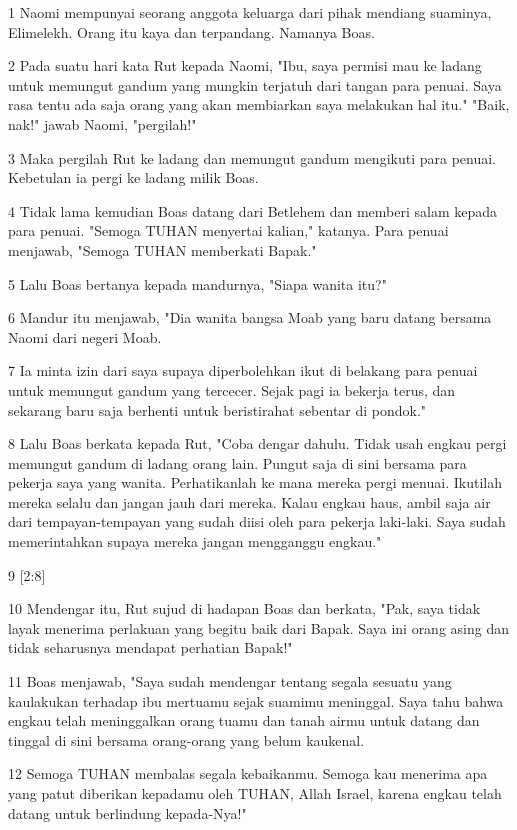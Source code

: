 \par 1 Naomi mempunyai seorang anggota keluarga dari pihak mendiang suaminya, Elimelekh. Orang itu kaya dan terpandang. Namanya Boas.
\par 2 Pada suatu hari kata Rut kepada Naomi, "Ibu, saya permisi mau ke ladang untuk memungut gandum yang mungkin terjatuh dari tangan para penuai. Saya rasa tentu ada saja orang yang akan membiarkan saya melakukan hal itu." "Baik, nak!" jawab Naomi, "pergilah!"
\par 3 Maka pergilah Rut ke ladang dan memungut gandum mengikuti para penuai. Kebetulan ia pergi ke ladang milik Boas.
\par 4 Tidak lama kemudian Boas datang dari Betlehem dan memberi salam kepada para penuai. "Semoga TUHAN menyertai kalian," katanya. Para penuai menjawab, "Semoga TUHAN memberkati Bapak."
\par 5 Lalu Boas bertanya kepada mandurnya, "Siapa wanita itu?"
\par 6 Mandur itu menjawab, "Dia wanita bangsa Moab yang baru datang bersama Naomi dari negeri Moab.
\par 7 Ia minta izin dari saya supaya diperbolehkan ikut di belakang para penuai untuk memungut gandum yang tercecer. Sejak pagi ia bekerja terus, dan sekarang baru saja berhenti untuk beristirahat sebentar di pondok."
\par 8 Lalu Boas berkata kepada Rut, "Coba dengar dahulu. Tidak usah engkau pergi memungut gandum di ladang orang lain. Pungut saja di sini bersama para pekerja saya yang wanita. Perhatikanlah ke mana mereka pergi menuai. Ikutilah mereka selalu dan jangan jauh dari mereka. Kalau engkau haus, ambil saja air dari tempayan-tempayan yang sudah diisi oleh para pekerja laki-laki. Saya sudah memerintahkan supaya mereka jangan mengganggu engkau."
\par 9 [2:8]
\par 10 Mendengar itu, Rut sujud di hadapan Boas dan berkata, "Pak, saya tidak layak menerima perlakuan yang begitu baik dari Bapak. Saya ini orang asing dan tidak seharusnya mendapat perhatian Bapak!"
\par 11 Boas menjawab, "Saya sudah mendengar tentang segala sesuatu yang kaulakukan terhadap ibu mertuamu sejak suamimu meninggal. Saya tahu bahwa engkau telah meninggalkan orang tuamu dan tanah airmu untuk datang dan tinggal di sini bersama orang-orang yang belum kaukenal.
\par 12 Semoga TUHAN membalas segala kebaikanmu. Semoga kau menerima apa yang patut diberikan kepadamu oleh TUHAN, Allah Israel, karena engkau telah datang untuk berlindung kepada-Nya!"
